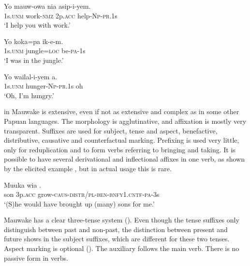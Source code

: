 \ea%
\label{ex:1:x1523}
\gll Yo  mauw-owa  nia  asip-i-yem. \\
 1s.\textsc{unm}  work-\textsc{nmz}  2p.\textsc{acc}  help-\textsc{Np}-\textsc{pr}.1s     \\
\glt `I help you with work.'
\z


\ea%
\label{ex:1:x1524}
\gll Yo  koka=pa  ik-e-m. \\
1s.\textsc{unm}  jungle=\textsc{loc}  be-\textsc{pa}-1s      \\
\glt `I was in the jungle.'
\z


\ea%
\label{ex:1:x1525}
\gll Yo  wailal-i-yem  a. \\
 1s.\textsc{unm}  hunger-\textsc{Np}-\textsc{pr}.1s  oh     \\
\glt `Oh, I'm hungry.'
\z


 in Mauwake is extensive, even if not as extensive and complex as in some other Papuan languages. The morphology is agglutinative, and  affixation is mostly very transparent.  Suffixes are used for subject, tense and aspect, benefactive, distributive, causative and counterfactual marking. Prefixing is used very little, only for reduplication and to form verbs referring to bringing and taking. It is possible to have several derivational and inflectional affixes in one verb, as shown by the elicited example , but in actual usage this is rare.


\ea%
\label{ex:1:x664}
\gll Muuka  wia . \\
 son  3p.\textsc{acc}  grow-\textsc{caus}-\textsc{distr/pl}-\textsc{ben}-\textsc{bnfy1.\textsc{cntf}-pa}-3s     \\
\glt `(S)he would have brought up (many) sons for me.'
\z


Mauwake has a clear three-tense system (). Even though the tense suffixes only distinguish between past and non-past, the distinction between present and future shows in the subject suffixes, which are different for these two tenses.  Aspect marking is optional ().  The auxiliary follows the main verb. There is no passive form in verbs.

